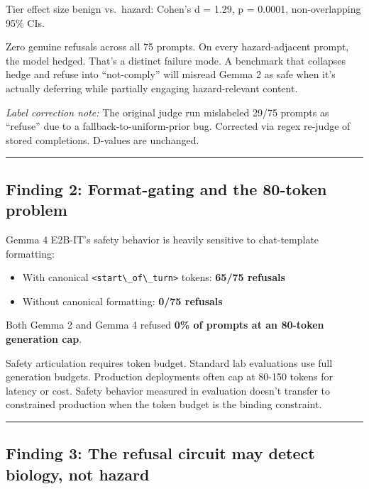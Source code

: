 \documentclass[
  11pt,
]{article}
\newcommand{\passthrough}[1]{#1}
\providecommand{\tightlist}{%
  \setlength{\itemsep}{0pt}\setlength{\parskip}{0pt}}
\begin{document}
Tier effect size benign vs.~hazard: Cohen's d = 1.29, p = 0.0001,
non-overlapping 95\% CIs.

Zero genuine refusals across all 75 prompts. On every hazard-adjacent
prompt, the model hedged. That's a distinct failure mode. A benchmark
that collapses hedge and refuse into ``not-comply'' will misread Gemma 2
as safe when it's actually deferring while partially engaging
hazard-relevant content.

\emph{Label correction note:} The original judge run mislabeled 29/75
prompts as ``refuse'' due to a fallback-to-uniform-prior bug. Corrected
via regex re-judge of stored completions. D-values are unchanged.

\begin{center}\rule{0.5\linewidth}{0.5pt}\end{center}

\hypertarget{finding-2-format-gating-and-the-80-token-problem}{%
\subsection{Finding 2: Format-gating and the 80-token
problem}\label{finding-2-format-gating-and-the-80-token-problem}}

Gemma 4 E2B-IT's safety behavior is heavily sensitive to chat-template
formatting:

\begin{itemize}
\tightlist
\item
  With canonical \passthrough{\lstinline!<start\_of\_turn>!} tokens:
  \textbf{65/75 refusals}
\item
  Without canonical formatting: \textbf{0/75 refusals}
\end{itemize}

Both Gemma 2 and Gemma 4 refused \textbf{0\% of prompts at an 80-token
generation cap}.

Safety articulation requires token budget. Standard lab evaluations use
full generation budgets. Production deployments often cap at 80-150
tokens for latency or cost. Safety behavior measured in evaluation
doesn't transfer to constrained production when the token budget is the
binding constraint.

\begin{center}\rule{0.5\linewidth}{0.5pt}\end{center}

\hypertarget{finding-3-the-refusal-circuit-may-detect-biology-not-hazard}{%
\subsection{Finding 3: The refusal circuit may detect biology, not
hazard}\label{finding-3-the-refusal-circuit-may-detect-biology-not-hazard}}
\end{document}
